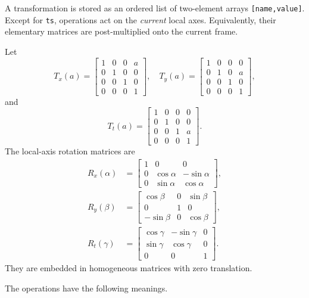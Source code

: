 \documentclass[11pt,a4paper]{article}
\begin{document}
A transformation is stored as an ordered list of two-element arrays
\texttt{[name,value]}.  Except for \texttt{ts}, operations act on the
\emph{current} local axes.  Equivalently, their elementary matrices are
post-multiplied onto the current frame.

Let
\begin{equation}
  T_x(a)=
  \begin{bmatrix}1&0&0&a\\0&1&0&0\\0&0&1&0\\0&0&0&1\end{bmatrix},\quad
  T_y(a)=
  \begin{bmatrix}1&0&0&0\\0&1&0&a\\0&0&1&0\\0&0&0&1\end{bmatrix},
\end{equation}
and
\begin{equation}
  T_t(a)=
  \begin{bmatrix}1&0&0&0\\0&1&0&0\\0&0&1&a\\0&0&0&1\end{bmatrix}.
\end{equation}
The local-axis rotation matrices are
\begin{align}
  R_x(\alpha)&=
  \begin{bmatrix}
    1&0&0\\0&\cos\alpha&-\sin\alpha\\0&\sin\alpha&\cos\alpha
  \end{bmatrix},\\
  R_y(\beta)&=
  \begin{bmatrix}
    \cos\beta&0&\sin\beta\\0&1&0\\-\sin\beta&0&\cos\beta
  \end{bmatrix},\\
  R_t(\gamma)&=
  \begin{bmatrix}
    \cos\gamma&-\sin\gamma&0\\\sin\gamma&\cos\gamma&0\\0&0&1
  \end{bmatrix}.
\end{align}
They are embedded in homogeneous matrices with zero translation.

The operations have the following meanings.
\end{document}
